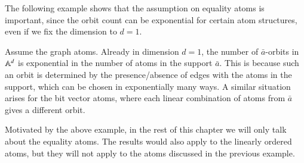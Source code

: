 The following example shows that the assumption on equality atoms is important, since the orbit count can be exponential for certain atom structures, even if we fix the dimension to $d=1$. 
\begin{myexample}
    Assume the graph atoms. Already in dimension $d=1$, the number of $\bar a$-orbits in $\mathbb A^d$ is exponential in the number of atoms in the support $\bar a$. This is because such an orbit is determined by the presence/absence of edges with the atoms in the support, which can be chosen in exponentially many ways. A similar situation arises for the bit vector atoms, where each linear combination of atoms from $\bar a$ gives a different orbit.
\end{myexample}

Motivated by the above example, in the rest of this chapter we will only talk about the equality atoms. The results would also apply to the linearly ordered atoms, but they will not apply to the atoms discussed in the previous example.


